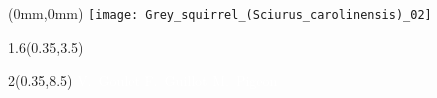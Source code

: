 

\begingroup
{}
\textblockorigin{0mm}{0mm}
\setlength{\parindent}{0mm}

\def\titlefmt{%
  \sffamily\bfseries\fontsize{45}{45}\selectfont\thetitle\par}
\def\authorsfmt{%
  \sffamily\mdseries\fontsize{28}{28}\selectfont
  V.\ Goulet \quad F.\ Guillot \quad M.\ Pigeon}
\def\affiliations{%
  \sffamily\mdseries
  \fontsize{28}{28}\selectfont
  Vincent Goulet \par
  \fontsize{18}{22}\selectfont
  École d'actuariat \\ Université Laval \par
  \fontsize{28}{40}\selectfont
  Frédérick Guillot \par
  \fontsize{18}{22}\selectfont
  Recherche et innovation \\ Co-operators \par
  \fontsize{28}{40}\selectfont
  Mathieu Pigeon \par
  \fontsize{18}{22}\selectfont
  Département de mathématiques \\ Université du Québec à Montréal}

\def\edition{%
  \sffamily\mdseries\fontsize{18}{18}\selectfont
  Édition {\fullcaps\year}.\month}

\begin{textblock*}{\paperwidth}(0mm,0mm)
  \texttt{[image: Grey\_squirrel\_(Sciurus\_carolinensis)\_02]}
\end{textblock*}

\begin{textblock*}{1.6\TPHorizModule}(0.35\TPHorizModule,3.5\TPVertModule)
  \textcolor{white}{\titlefmt}
\end{textblock*}

\begin{textblock*}{2\TPHorizModule}(0.35\TPHorizModule,8.5\TPVertModule)
  \sffamily\mdseries\fontsize{28}{28}\selectfont
  \textcolor{white}{\authorsfmt}
\end{textblock*}

